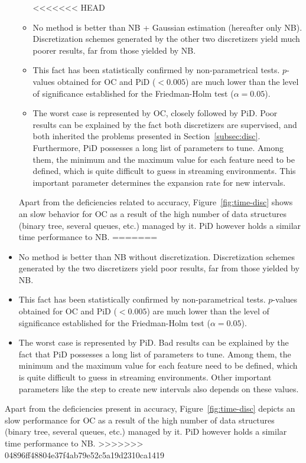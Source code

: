 \documentclass[preprint,12pt]{elsarticle}
\begin{document}
\begin{itemize}
\begin{itemize}
<<<<<<< HEAD
	\item No method is better than NB + Gaussian estimation (hereafter only NB). Discretization schemes generated by the other two discretizers yield much poorer results, far from those yielded by NB. 
	\item This fact has been statistically confirmed by non-parametrical tests. $p$-values obtained for OC and PiD ($<0.005$) are much lower than the level of significance established for the Friedman-Holm test ($\alpha = 0.05$).
	\item The worst case is represented by OC, closely followed by PiD. Poor results can be explained by the fact both discretizers are supervised, and both inherited the problems presented in Section~\ref{subsec:disc}. Furthermore, PiD possesses a long list of parameters to tune. Among them, the minimum and the maximum value for each feature need to be defined, which is quite difficult to guess in streaming environments. This important parameter determines the expansion rate for new intervals.
\end{itemize}

Apart from the deficiencies related to accuracy, Figure~\ref{fig:time-disc} shows an slow behavior for OC as a result of the high number of data structures (binary tree, several queues, etc.) managed by it. PiD however holds a similar time performance to NB. 
=======
	\item No method is better than NB without discretization. Discretization schemes generated by the two discretizers yield poor results, far from those yielded by NB. 
	\item This fact has been statistically confirmed by non-parametrical tests. $p$-values obtained for OC and PiD ($<0.005$) are much lower than the level of significance established for the Friedman-Holm test ($\alpha = 0.05$).
	\item The worst case is represented by PiD. Bad results can be explained by the fact that PiD possesses a long list of parameters to tune. Among them, the minimum and the maximum value for each feature need to be defined, which is quite difficult to guess in streaming environments. Other important parameters like the step to create new intervals also depends on these values.
\end{itemize}

Apart from the deficiencies present in accuracy, Figure~\ref{fig:time-disc} depicts an slow performance for OC as a result of the high number of data structures (binary tree, several queues, etc.) managed by it. PiD however holds a similar time performance to NB. 
>>>>>>> 04896ff48804e37f4ab79e52c5a19d2310ca1419
\end{document}
